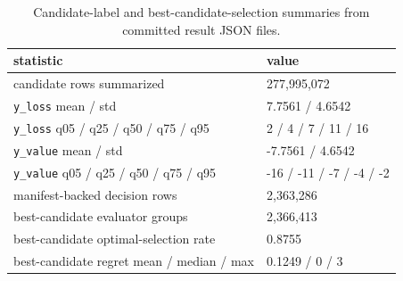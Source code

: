 \begin{table}[t]
  \centering
  \footnotesize
  \caption{Candidate-label and best-candidate-selection summaries from committed result JSON files.}
  \label{tab:label-selection-summary}
  \begin{tabularx}{\columnwidth}{@{}P{0.50\columnwidth}L@{}}
    \toprule
    statistic & value \\
    \midrule
    candidate rows summarized & 277,995,072 \\
    \texttt{y\_loss} mean / std & 7.7561 / 4.6542 \\
    \texttt{y\_loss} q05 / q25 / q50 / q75 / q95 & 2 / 4 / 7 / 11 / 16 \\
    \texttt{y\_value} mean / std & -7.7561 / 4.6542 \\
    \texttt{y\_value} q05 / q25 / q50 / q75 / q95 & -16 / -11 / -7 / -4 / -2 \\
    manifest-backed decision rows & 2,363,286 \\
    best-candidate evaluator groups & 2,366,413 \\
    best-candidate optimal-selection rate & 0.8755 \\
    best-candidate regret mean / median / max & 0.1249 / 0 / 3 \\
    \bottomrule
  \end{tabularx}
\end{table}

